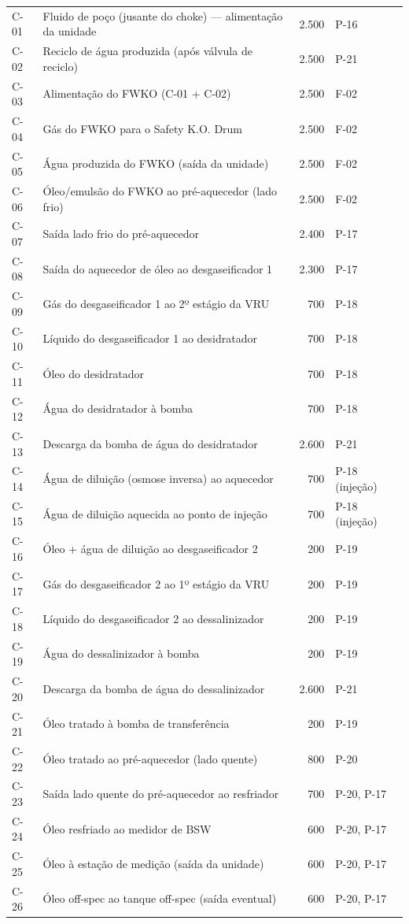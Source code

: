 \documentclass[11pt,a4paper]{article}
\numberwithin{equation}{section}
\numberwithin{table}{section}
\numberwithin{figure}{section}
\begin{document}
\begin{longtable}{lL{7.3cm}rL{3.6cm}}
C-01 & Fluido de poço (jusante do choke) — alimentação da unidade & 2.500 & P-16\\
C-02 & Reciclo de água produzida (após válvula de reciclo) & 2.500 & P-21\\
C-03 & Alimentação do FWKO (C-01 + C-02) & 2.500 & F-02\\
C-04 & Gás do FWKO para o Safety K.O. Drum & 2.500 & F-02\\
C-05 & Água produzida do FWKO (saída da unidade) & 2.500 & F-02\\
C-06 & Óleo/emulsão do FWKO ao pré-aquecedor (lado frio) & 2.500 & F-02\\
C-07 & Saída lado frio do pré-aquecedor & 2.400 & P-17\\
C-08 & Saída do aquecedor de óleo ao desgaseificador 1 & 2.300 & P-17\\
C-09 & Gás do desgaseificador 1 ao 2º estágio da VRU & 700 & P-18\\
C-10 & Líquido do desgaseificador 1 ao desidratador & 700 & P-18\\
C-11 & Óleo do desidratador & 700 & P-18\\
C-12 & Água do desidratador à bomba & 700 & P-18\\
C-13 & Descarga da bomba de água do desidratador & 2.600 & P-21\\
C-14 & Água de diluição (osmose inversa) ao aquecedor & 700 & P-18 (injeção)\\
C-15 & Água de diluição aquecida ao ponto de injeção & 700 & P-18 (injeção)\\
C-16 & Óleo + água de diluição ao desgaseificador 2 & 200 & P-19\\
C-17 & Gás do desgaseificador 2 ao 1º estágio da VRU & 200 & P-19\\
C-18 & Líquido do desgaseificador 2 ao dessalinizador & 200 & P-19\\
C-19 & Água do dessalinizador à bomba & 200 & P-19\\
C-20 & Descarga da bomba de água do dessalinizador & 2.600 & P-21\\
C-21 & Óleo tratado à bomba de transferência & 200 & P-19\\
C-22 & Óleo tratado ao pré-aquecedor (lado quente) & 800 & P-20\\
C-23 & Saída lado quente do pré-aquecedor ao resfriador & 700 & P-20, P-17\\
C-24 & Óleo resfriado ao medidor de BSW & 600 & P-20, P-17\\
C-25 & Óleo à estação de medição (saída da unidade) & 600 & P-20, P-17\\
C-26 & Óleo off-spec ao tanque off-spec (saída eventual) & 600 & P-20, P-17\\
\bottomrule\end{longtable}
\end{document}
